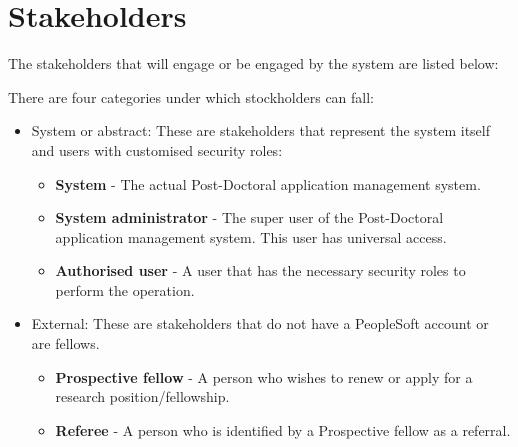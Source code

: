 \documentclass[12pt]{article}
\begin{document}
\newpage
\section{Stakeholders}
\vspace{0.2in}

The stakeholders that will engage or be engaged by the system are listed below:

There are four categories under which stockholders can fall:
\begin{itemize}	
\item System or abstract:
These are stakeholders that represent the system itself and users with customised security roles:
\begin{itemize}
\item \textbf{System} - The actual Post-Doctoral application management system.
\item \textbf{System administrator} - The super user of the Post-Doctoral application management system. This user has universal access.
\item \textbf{Authorised user} - A user that has the necessary security roles to perform the operation.
\end{itemize}
\item External:
These are stakeholders that do not have a PeopleSoft account or are fellows.
\begin{itemize}	
\item \textbf{Prospective fellow} - A person who wishes to renew or apply for a research position/fellowship.
\item \textbf{Referee} - A person who is identified by a Prospective fellow as a referral.
\end{itemize}


\end{itemize}
\end{document}
